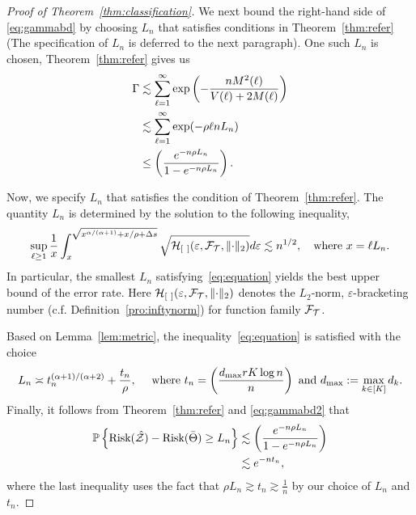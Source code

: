 \documentclass[twoside,11pt]{article}
\theoremstyle{plain}
\theoremstyle{definition}
\def\risk{\textup{Risk}}
\begin{document}
\begin{proof}[Proof of Theorem~\ref{thm:classification}]
We next bound the right-hand side of \eqref{eq:gammabd} by choosing $L_n$ that satisfies conditions in Theorem~\ref{thm:refer} (The specification of $L_n$ is deferred to the next paragraph). One such $L_n$ is chosen, Theorem~\ref{thm:refer} gives us 
\begin{align}\label{eq:gammabd2}
\Gamma&\lesssim \sum_{\ell=1}^\infty \exp\left(-\frac{nM^2(\ell)}{V(\ell)+2M(\ell)}\right)\\&\lesssim \sum_{\ell=1}^\infty	\exp(-\rho  \ell n L_n)\\&\leq \left(e^{-n\rho L_n}\over 1-e^{-n\rho L_n}\right).
\end{align}

Now, we specify $L_n$ that satisfies the condition of Theorem~\ref{thm:refer}. The quantity $L_n$ is determined by the solution to the following inequality,
\begin{equation}\label{eq:equation}
\sup_{\ell\geq 1}{1\over x}\int_{x}^{\sqrt{x^{\alpha/(\alpha+1)}+x/\rho+\Delta s}}\sqrt{\tH_{[\ ]}(\varepsilon, \tF_{\tT},\vnormSize{}{\cdot})}d\varepsilon \lesssim n^{1/2}, \quad \text{where }x=\ell L_n.
\end{equation}
In particular, the smallest $L_n$ satisfying~\eqref{eq:equation} yields the best upper bound of the error rate. Here $\tH_{[\ ]}(\varepsilon, \tF_{\tT}, \vnormSize{}{\cdot})$ denotes the $L_2$-norm, $\varepsilon$-bracketing number (c.f. Definition~\ref{pro:inftynorm}) for function family $\mathcal{F}_{\mathcal{T}}$.

Based on Lemma~\ref{lem:metric}, the inequality~\eqref{eq:equation} is satisfied with the choice
\begin{equation}\label{eq:delta}
L_n\asymp  t_n^{(\alpha+1)/(\alpha+2)}+{t_n\over \rho}, \quad \text{ where } t_n = \left(d_{\max}rK \log n\over n\right) \text{ and } d_{\max} := \max_{k\in[K]} d_k.
\end{equation}
Finally, it follows from Theorem~\ref{thm:refer} and \eqref{eq:gammabd2} that 
\begin{align}
\mathbb{P}\left\{\risk(\hat \tZ)-\risk(\bar\Theta)\geq L_n\right\}&\lesssim \left(e^{-n\rho L_n}\over 1-e^{-n\rho L_n}\right)\\&\lesssim e^{-nt_n},
\end{align}
where the last inequality uses the fact that $\rho L_n\gtrsim t_n\gtrsim \frac{1}{n}$ by our choice of $L_n$ and $t_n$.



\end{proof}
\end{document}
